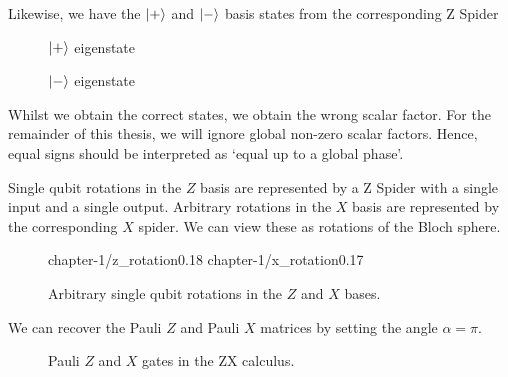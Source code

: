 Likewise, we have the $\ket +$ and $\ket -$ basis states from the corresponding Z Spider

\begin{figure}[H]
\centering
\begin{minipage}{.4\textwidth}
    \centering
    \caption{$\ket +$ eigenstate}
\end{minipage}%
\begin{minipage}{.4\textwidth}
    \centering
    \caption{$\ket -$ eigenstate}
\end{minipage}
\end{figure}

Whilst we obtain the correct states, we obtain the wrong scalar factor. For the remainder of this thesis, we will ignore global non-zero scalar factors. Hence, equal signs should be interpreted as `equal up to a global phase'.

Single qubit rotations in the $Z$ basis are represented by a Z Spider with a single input and a single output. Arbitrary rotations in the $X$ basis are represented by the corresponding $X$ spider. We can view these as rotations of the Bloch sphere.

\begin{figure}[H]
\centering
{}
{chapter-1/z_rotation}{0.18}
%
{chapter-1/x_rotation}{0.17}
\caption{Arbitrary single qubit rotations in the $Z$ and $X$ bases.}
\end{figure}

We can recover the Pauli $Z$ and Pauli $X$ matrices by setting the angle $\alpha = \pi$.

\begin{figure}[H]
\centering
{}
\caption{Pauli $Z$ and $X$ gates in the ZX calculus.}
\end{figure}

